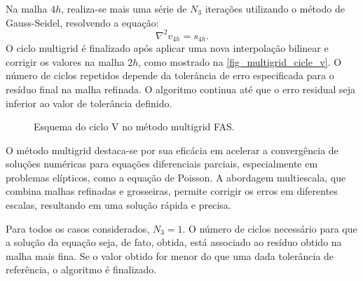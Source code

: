 Na malha $4h$, realiza-se mais uma série de $N_3$ iterações utilizando o método de Gauss-Seidel, resolvendo a equação:
\[
\nabla^2 v_{4h} = s_{4h}.
\]
O ciclo multigrid é finalizado após aplicar uma nova interpolação bilinear e corrigir os valores na malha $2h$, como mostrado na \autoref{fig_multigrid_cicle_v}. O número de ciclos repetidos depende da tolerância de erro especificada para o resíduo final na malha refinada. O algoritmo continua até que o erro residual seja inferior ao valor de tolerância definido.

\begin{figure}[htb]
    \centering
    \caption{Esquema do ciclo V no método multigrid FAS.}\label{fig_multigrid_cicle_v}
\end{figure}

O método multigrid destaca-se por sua eficácia em acelerar a convergência de soluções numéricas para equações diferenciais parciais, especialmente em problemas elípticos, como a equação de Poisson. A abordagem multiescala, que combina malhas refinadas e grosseiras, permite corrigir os erros em diferentes escalas, resultando em uma solução rápida e precisa.

Para todos os casos considerados, $N_3=1$. O número de ciclos necessário para que a solução da equação seja, de fato, obtida, está associado ao resíduo obtido na malha mais fina. Se o valor obtido for menor do que uma dada tolerância de referência, o algoritmo é finalizado.

